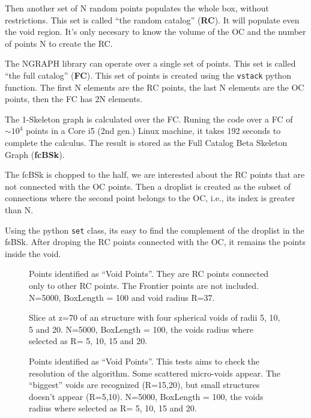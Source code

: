 \documentclass[preprint]{aastex62}
\begin{document}
Then another set of N random points populates the whole box, without restrictions.
This set is called ``the random catalog'' (\textbf{RC}). It will populate even
the void region. It's only necesary to know the volume of the OC and the number
of points N to create the RC.

The NGRAPH library can operate over a single set of points. This set is called
``the full catalog'' (\textbf{FC}). This set of points is created using the
\texttt{vstack} python function. The first N elements are the RC points, the last
N elements are the OC points, then the FC has 2N elements.

The 1-Skeleton graph is calculated over the FC. Runing the code over a FC of
$\sim 10^4$ points in a Core i5 (2nd gen.) Linux machine, it takes 192 seconds
to complete the calculus. The result is stored as the Full Catalog Beta
Skeleton Graph (\textbf{fcBSk}).

The fcBSk is chopped to the half, we are interested about the RC points that
are not connected with the OC points. Then a droplist is created as the
subset of connections where the second point belongs to the OC, i.e., its index
is greater than N.

Using the python  \texttt{set} class, its easy to find the complement of the
droplist in the fsBSk. After droping the RC points connected with the OC, it
remains the points inside the void.


\begin{figure}
  \caption{Points identified as ``Void Points''. They are RC points connected
    only to other RC points. The Frontier points are not included.
    N=5000, BoxLength = 100 and void radius R=37.
    \label{First void recognition}}
\end{figure}


\begin{figure}
  \caption{Slice at z=70 of an structure with four
    spherical voids of radii 5, 10, 5 and 20.
    N=5000, BoxLength = 100, the voids radius where selected as R= 5, 10, 15
    and 20.
    \label{slice for multiple spherical voids}}
\end{figure}


\begin{figure}
  \caption{Points identified as ``Void Points''. This tests aims to check
    the resolution of the algorithm. Some scattered micro-voids appear.
    The ``biggest'' voids are recognized (R=15,20), but small structures doesn't
    appear (R=5,10).
    N=5000, BoxLength = 100, the voids radius where selected as R= 5, 10, 15
    and 20.
    \label{Testing multiple spherical voids}}
\end{figure}
\end{document}
